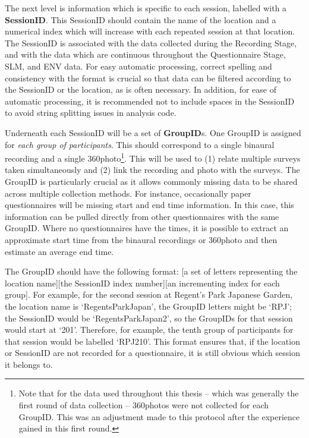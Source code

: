    The next level is information which is specific to each session, labelled with a \textbf{SessionID}. This SessionID should contain the name of the location and a numerical index which will increase with each repeated session at that location. The SessionID is associated with the data collected during the Recording Stage, and with the data which are continuous throughout the Questionnaire Stage, SLM, and ENV data. For easy automatic processing, correct spelling and consistency with the format is crucial so that data can be filtered according to the SessionID or the location, as is often necessary. In addition, for ease of automatic processing, it is recommended not to include spaces in the SessionID to avoid string splitting issues in analysis code.

   Underneath each SessionID will be a set of \textbf{GroupID}s. One GroupID is assigned for \emph{each group of participants}. This should correspond to a single binaural recording and a single 360\degree photo\footnote{Note that for the data used throughout this thesis -- which was generally the first round of data collection -- 360\degree photos were not collected for each GroupID. This was an adjustment made to this protocol after the experience gained in this first round.}. This will be used to (1) relate multiple surveys taken simultaneously and (2) link the recording and photo with the surveys. The GroupID is particularly crucial as it allows commonly missing data to be shared across multiple collection methods. For instance, occasionally paper questionnaires will be missing start and end time information. In this case, this information can be pulled directly from other questionnaires with the same GroupID. Where no questionnaires have the times, it is possible to extract an approximate start time from the binaural recordings or 360\degree photo and then estimate an average end time.

   The GroupID should have the following format: [a set of letters representing the location name][the SessionID index number][an incrementing index for each group]. For example, for the second session at Regent's Park Japanese Garden, the location name is `RegentsParkJapan', the GroupID letters might be `RPJ'; the SessionID would be `RegentsParkJapan2', so the GroupIDs for that session would start at `201'. Therefore, for example, the tenth group of participants for that session would be labelled `RPJ210'. This format ensures that, if the location or SessionID are not recorded for a questionnaire, it is still obvious which session it belongs to.


